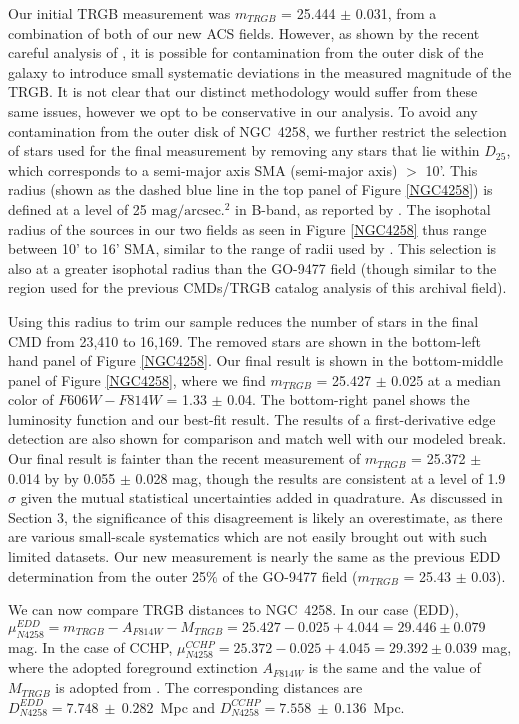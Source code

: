\documentclass[twocolumn]{aastex62}
\begin{document}
Our initial TRGB measurement was $m_{TRGB}$ = 25.444 $\pm$ 0.031, from a combination of both of our new ACS fields. However, as shown by the recent careful analysis of \cite{2021ApJ...906..125J}, it is possible for contamination from the outer disk of the galaxy to introduce small systematic deviations in the measured magnitude of the TRGB. It is not clear that our distinct methodology would suffer from these same issues, however we opt to be conservative in our analysis. To avoid any contamination from the outer disk of NGC~4258, we further restrict the selection of stars used for the final measurement by removing any stars that lie within $D_{25}$, which corresponds to a semi-major axis SMA (semi-major axis) $>$ 10'. This radius (shown as the dashed blue line in the top panel of Figure \ref{NGC4258}) is defined at a level of 25 $\mathrm{mag/arcsec.^{2}}$ in B-band, as reported by \cite{1991rc3..book.....D}. The isophotal radius of the sources in our two fields as seen in Figure \ref{NGC4258} thus range between 10' to 16' SMA, similar to the range of radii used by \cite{2021ApJ...906..125J}. This selection is also at a greater isophotal radius than the GO-9477 field (though similar to the region used for the previous CMDs/TRGB catalog analysis of this archival field).

Using this radius to trim our sample reduces the number of stars in the final CMD from 23,410 to 16,169. The removed stars are shown in the bottom-left hand panel of Figure \ref{NGC4258}. Our final result is shown in the bottom-middle panel of Figure \ref{NGC4258}, where we find $m_{TRGB}$ = 25.427 $\pm$ 0.025 at a median color of $F606W-F814W$ = 1.33 $\pm$ 0.04. The bottom-right panel shows the luminosity function and our best-fit result. The results of a first-derivative edge detection are also shown for comparison and match well with our modeled break. Our final result is fainter than the recent measurement of $m_{TRGB}$ = 25.372 $\pm$ 0.014 by \cite{2021ApJ...906..125J} by 0.055 $\pm$ 0.028 mag, though the results are consistent at a level of 1.9$\sigma$ given the mutual statistical uncertainties added in quadrature. As discussed in Section 3, the significance of this disagreement is likely an overestimate, as there are various small-scale systematics which are not easily brought out with such limited datasets. Our new measurement is nearly the same as the previous EDD determination from the outer 25$\%$ of the GO-9477 field ($m_{TRGB}$ = 25.43 $\pm$ 0.03). 

We can now compare TRGB distances to NGC~4258. In our case (EDD), $\mu_{N4258}^{EDD} = m_{TRGB} -A_{F814W} -M_{TRGB} = 25.427-0.025+4.044 = 29.446 \pm 0.079$ mag. In the case of CCHP, $\mu_{N4258}^{CCHP} = 25.372 - 0.025 + 4.045 = 29.392 \pm 0.039$ mag, where the adopted foreground extinction $A_{F814W}$ is the same and the value of $M_{TRGB}$ is adopted from \citet{2021arXiv210613337H}. The corresponding distances are $D_{N4258}^{EDD} = 7.748~\pm~0.282$~Mpc and $D_{N4258}^{CCHP}=7.558~\pm~0.136$~Mpc.
\end{document}
